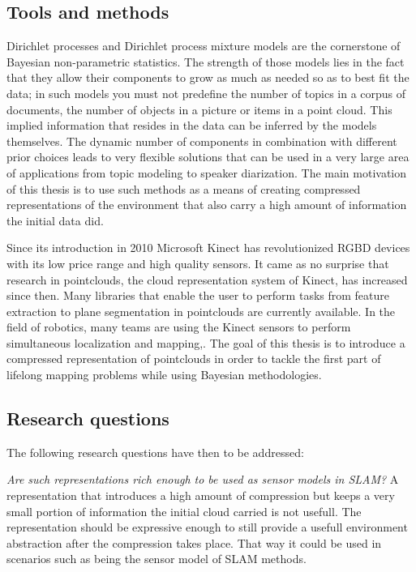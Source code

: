 \documentclass[twoside,hidelinks]{article}
\begin{document}
\subsection{Tools and methods}
Dirichlet processes and Dirichlet process mixture models \cite{nonParam} are the cornerstone of Bayesian non-parametric statistics. The strength of those models lies in the fact that they allow their components to grow as much as needed so as to best fit the data; in such models you must not predefine the number of topics in a corpus of documents, the number of objects in a picture or items in a point cloud. This implied information that resides in the data can be inferred by the models themselves. The dynamic number of components in combination with different prior choices leads to very flexible solutions that can be used in a very large area of applications from topic modeling\cite{LDA} to speaker diarization\cite{speakerDiar}.
The main motivation of this thesis is to use such methods as a means of creating compressed representations of the environment that also carry a high amount of information the initial data did. 

Since its introduction in 2010 Microsoft Kinect\cite{kinect} has revolutionized RGBD devices with its low price range and high quality sensors. It came as no surprise that research in pointclouds, the cloud representation system of Kinect, has increased since then. Many libraries that enable the user to perform tasks from feature extraction to plane segmentation\cite{pcl} in pointclouds are currently available. In the field of robotics, many teams are using the Kinect sensors to perform simultaneous localization and mapping\cite{rtabmap},\cite{rgbdmapping}. The goal of this thesis is to introduce a compressed representation of pointclouds in order to tackle the first part of lifelong mapping problems while using Bayesian methodologies. 


\subsection{Research questions}


The following research questions have then to be addressed: 

\textit{Are such representations rich enough to be used as sensor models in SLAM?}
A representation that introduces a high amount of compression but keeps a very small portion of information the initial cloud carried is not usefull. The representation should be expressive enough to still provide a usefull environment abstraction after the compression takes place. That way it could be used in scenarios such as being the sensor model of SLAM methods.
\end{document}
